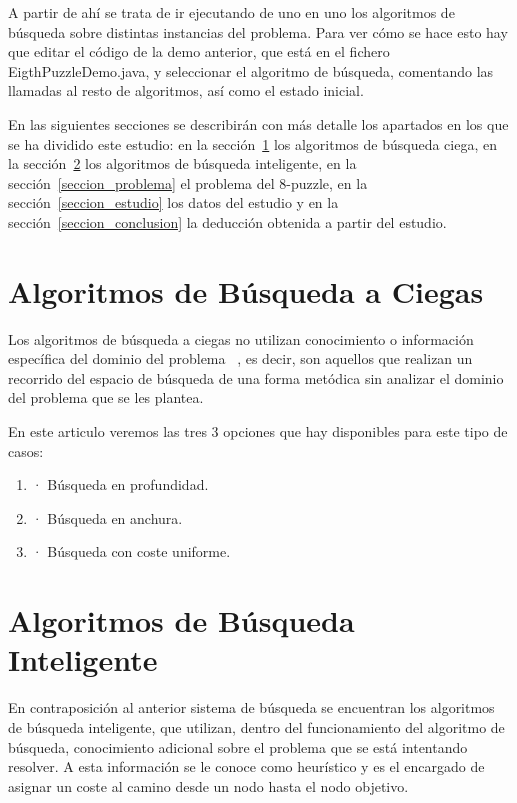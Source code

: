 \documentclass[runningheads]{llncs}
\begin{document}
A partir de ahí se trata de ir ejecutando de uno en uno los algoritmos de búsqueda sobre distintas instancias del problema. Para ver cómo se hace esto hay que editar el código de la demo anterior, que está en el fichero EigthPuzzleDemo.java, y seleccionar el algoritmo de búsqueda, comentando las llamadas al resto de algoritmos, así como el estado inicial.

En las siguientes secciones se describirán con más detalle los apartados en los que se ha dividido este estudio: en la sección~\ref{seccion_ciega} los algoritmos de búsqueda ciega, en la sección~\ref{seccion_inteligente} los algoritmos de búsqueda inteligente, en la sección~\ref{seccion_problema} el problema del 8-puzzle, en la sección~\ref{seccion_estudio} los datos del estudio y en la sección~\ref{seccion_conclusion} la deducción obtenida a partir del estudio.


\section{Algoritmos de Búsqueda a Ciegas}\label{seccion_ciega}

Los algoritmos de búsqueda a ciegas no utilizan conocimiento o información específica del dominio del problema ~\cite{referencia_Busqueda_Ciegas}, es decir, son aquellos que realizan un recorrido del espacio de búsqueda de una forma metódica sin analizar el dominio del problema que se les plantea.

En este articulo veremos las tres 3 opciones que hay disponibles para este tipo de casos:
\begin{enumerate}[\hspace{2cm}]
\item · Búsqueda en profundidad.
\item · Búsqueda en anchura.
\item · Búsqueda con coste uniforme. 
\end{enumerate}

\section{Algoritmos de Búsqueda Inteligente}\label{seccion_inteligente}

En contraposición al anterior sistema de búsqueda se encuentran los algoritmos de búsqueda inteligente, que utilizan, dentro del funcionamiento del algoritmo de búsqueda, conocimiento adicional sobre el problema que se está intentando resolver. A esta información se le conoce como heurístico y es el encargado de asignar un coste al camino desde un nodo hasta el nodo objetivo.
\end{document}
